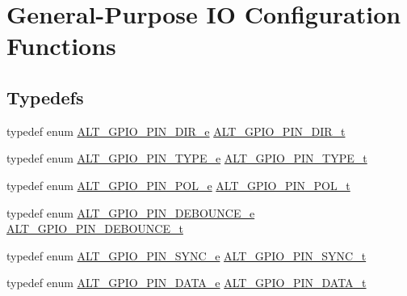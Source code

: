 \hypertarget{group__ALT__GPIO__API__CONFIG}{}\section{General-\/\+Purpose IO Configuration Functions}
\label{group__ALT__GPIO__API__CONFIG}
\subsection*{Typedefs}
\begin{DoxyCompactItemize}
\item 
typedef enum \mbox{\hyperlink{group__ALT__GPIO__API__CONFIG_ga788d8a869480b2f3743c8ba1c382df67}{A\+L\+T\+\_\+\+G\+P\+I\+O\+\_\+\+P\+I\+N\+\_\+\+D\+I\+R\+\_\+e}} \mbox{\hyperlink{group__ALT__GPIO__API__CONFIG_ga96132f0cfe4bb0ffc0f9ec8a392a45f3}{A\+L\+T\+\_\+\+G\+P\+I\+O\+\_\+\+P\+I\+N\+\_\+\+D\+I\+R\+\_\+t}}
\item 
typedef enum \mbox{\hyperlink{group__ALT__GPIO__API__CONFIG_gae750a74a5eafd2f86cf1c11749471465}{A\+L\+T\+\_\+\+G\+P\+I\+O\+\_\+\+P\+I\+N\+\_\+\+T\+Y\+P\+E\+\_\+e}} \mbox{\hyperlink{group__ALT__GPIO__API__CONFIG_gafa3659cf3d59e915a16c591a73258eef}{A\+L\+T\+\_\+\+G\+P\+I\+O\+\_\+\+P\+I\+N\+\_\+\+T\+Y\+P\+E\+\_\+t}}
\item 
typedef enum \mbox{\hyperlink{group__ALT__GPIO__API__CONFIG_ga0b9b54154f761155bf331b3f0e794633}{A\+L\+T\+\_\+\+G\+P\+I\+O\+\_\+\+P\+I\+N\+\_\+\+P\+O\+L\+\_\+e}} \mbox{\hyperlink{group__ALT__GPIO__API__CONFIG_gac97da06ff658611bcd2b12753dfc4a10}{A\+L\+T\+\_\+\+G\+P\+I\+O\+\_\+\+P\+I\+N\+\_\+\+P\+O\+L\+\_\+t}}
\item 
typedef enum \mbox{\hyperlink{group__ALT__GPIO__API__CONFIG_ga0c161a7f66ca55815c2e41bb914ded83}{A\+L\+T\+\_\+\+G\+P\+I\+O\+\_\+\+P\+I\+N\+\_\+\+D\+E\+B\+O\+U\+N\+C\+E\+\_\+e}} \mbox{\hyperlink{group__ALT__GPIO__API__CONFIG_gac48653c26697d3fd17d9029252655ac2}{A\+L\+T\+\_\+\+G\+P\+I\+O\+\_\+\+P\+I\+N\+\_\+\+D\+E\+B\+O\+U\+N\+C\+E\+\_\+t}}
\item 
typedef enum \mbox{\hyperlink{group__ALT__GPIO__API__CONFIG_ga77dc8aa651f28ec168db805e9053fe46}{A\+L\+T\+\_\+\+G\+P\+I\+O\+\_\+\+P\+I\+N\+\_\+\+S\+Y\+N\+C\+\_\+e}} \mbox{\hyperlink{group__ALT__GPIO__API__CONFIG_ga59a09621c4d2fa01dc9d8cc287c11e9a}{A\+L\+T\+\_\+\+G\+P\+I\+O\+\_\+\+P\+I\+N\+\_\+\+S\+Y\+N\+C\+\_\+t}}
\item 
typedef enum \mbox{\hyperlink{group__ALT__GPIO__API__CONFIG_gac392f6d8108c038acc4ab0b1533c2eef}{A\+L\+T\+\_\+\+G\+P\+I\+O\+\_\+\+P\+I\+N\+\_\+\+D\+A\+T\+A\+\_\+e}} \mbox{\hyperlink{group__ALT__GPIO__API__CONFIG_ga757cd8797c8bb2ed86d75d961ce9041b}{A\+L\+T\+\_\+\+G\+P\+I\+O\+\_\+\+P\+I\+N\+\_\+\+D\+A\+T\+A\+\_\+t}}

\end{DoxyCompactItemize}
